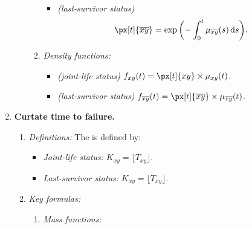 \begin{enumerate}
\begin{enumerate}[label={(\arabic*)}]
\begin{enumerate}[label={(\roman*)}]
\begin{itemize}
\item \emph{(last-survivor status)}
\[
\px[t]{\overline{xy}}=\exp\qty(-\int_{0}^{t}\mu_{\overline{xy}}(s)\dd{s}).
\]
\end{itemize}
\item \emph{Density functions:}
\begin{itemize}
\item \emph{(joint-life status)} \(f_{xy}(t)=\px[t]{xy}\times \mu_{xy}(t)\).
\item \emph{(last-survivor status)} \(f_{\overline{xy}}(t)=\px[t]{\overline{xy}}\times \mu_{\overline{xy}}(t)\).
\end{itemize}
\end{enumerate}
\end{enumerate}
\item \textbf{Curtate time to failure.}
\begin{enumerate}[label={(\arabic*)}]
\item \emph{Definitions:} The  is defined by:
\begin{itemize}
\item \emph{Joint-life status:} \(K_{xy}=\lfloor T_{xy}\rfloor\).
\item \emph{Last-survivor status:} \(K_{\overline{xy}}=\lfloor T_{\overline{xy}}\rfloor\).
\end{itemize}
\item \emph{Key formulas:}
\begin{enumerate}[label={(\roman*)}]
\item \emph{Mass functions:}

\end{enumerate}
\end{enumerate}
\end{enumerate}
